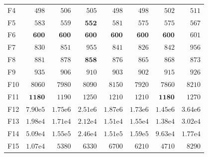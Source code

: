 \begin{tabular}{lrrrrrrr}
F4 & $498$ & $506$ & $505$ & $498$ & $498$ & $502$ & $511$ \\
F5 & $583$ & $559$ & $\mathbf{552}$ & $581$ & $575$ & $575$ & $567$ \\
F6 & $\mathbf{600}$ & $\mathbf{600}$ & $\mathbf{600}$ & $\mathbf{600}$ & $\mathbf{600}$ & $\mathbf{600}$ & $601$ \\
F7 & $830$ & $851$ & $955$ & $841$ & $826$ & $842$ & $956$ \\
F8 & $881$ & $878$ & $\mathbf{858}$ & $876$ & $865$ & $868$ & $873$ \\
F9 & $935$ & $906$ & $910$ & $903$ & $902$ & $915$ & $926$ \\
F10 & $8060$ & $7980$ & $8090$ & $8150$ & $7920$ & $7860$ & $8210$ \\
F11 & $\mathbf{1180}$ & $1190$ & $1250$ & $1210$ & $1210$ & $\mathbf{1180}$ & $1270$ \\
F12 & $7.90\mathrm{e}{5}$ & $1.75\mathrm{e}{6}$ & $2.51\mathrm{e}{6}$ & $1.87\mathrm{e}{6}$ & $1.73\mathrm{e}{6}$ & $1.45\mathrm{e}{6}$ & $3.64\mathrm{e}{6}$ \\
F13 & $1.98\mathrm{e}{4}$ & $1.71\mathrm{e}{4}$ & $2.12\mathrm{e}{4}$ & $1.51\mathrm{e}{4}$ & $1.55\mathrm{e}{4}$ & $1.38\mathrm{e}{4}$ & $3.02\mathrm{e}{4}$ \\
F14 & $5.09\mathrm{e}{4}$ & $1.55\mathrm{e}{5}$ & $2.46\mathrm{e}{4}$ & $1.51\mathrm{e}{5}$ & $1.59\mathrm{e}{5}$ & $9.63\mathrm{e}{4}$ & $1.77\mathrm{e}{4}$ \\
F15 & $1.07\mathrm{e}{4}$ & $5380$ & $6330$ & $6700$ & $6210$ & $4710$ & $8290$ \\
\bottomrule
\end{tabular}
